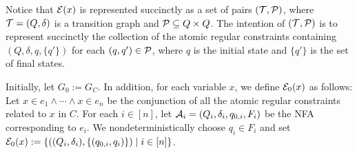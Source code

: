 Notice that $\mathcal{E}(x)$ is represented succinctly as a set of pairs $(\mathcal{T}, \mathcal{P})$, where $\mathcal{T}=(Q, \delta)$ is a transition graph and $\mathcal{P} \subseteq Q \times Q$. The intention of $(\mathcal{T}, \mathcal{P})$ is to represent succinctly the collection of the atomic regular constraints containing $(Q, \delta, q, \{q'\})$ for each $(q,q') \in \mathcal{P}$, where $q$ is the initial state and $\{q'\}$ is the set of final states.


Initially, let $G_0:= G_C$. In addition, for each variable $x$, we define $\mathcal{E}_0(x)$ as follows: Let $x \in e_1 \wedge \cdots \wedge x \in e_n$ be the conjunction of all the atomic regular constraints related to $x$ in $C$. For each $i \in [n]$, let $\mathcal{A}_i=(Q_i, \delta_i, q_{0,i}, F_i)$ be the NFA corresponding to $e_i$. We nondeterministically choose $q_i \in F_i$ and set $\mathcal{E}_0(x):=  \left\{((Q_i, \delta_i), \{(q_{0,i}, q_i)\}) \mid i \in [n] \right\}$.


%


